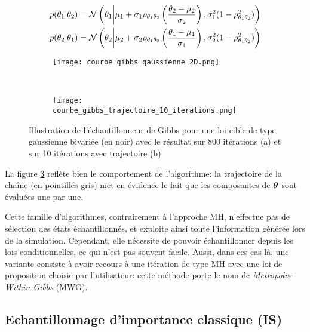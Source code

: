  \begin{equation}
 \label{eq_conditionnelles_gaussienne_bivariee}
 \begin{split}
 p(\theta_1 | \theta_2) &= \mathcal{N}\left(\theta_1 \middle\vert \mu_1 + \sigma_1 {\rho}_{\theta_1\theta_2} \left(\dfrac{\theta_2 - \mu_2}{\sigma_2}\right), \sigma_1^2 (1-{\rho}_{\theta_1\theta_2}^2)\right) \\
 p(\theta_2 | \theta_1) &= \mathcal{N}\left(\theta_2 \middle\vert \mu_2 + \sigma_2 {\rho}_{\theta_1\theta_2} \left(\dfrac{\theta_1 - \mu_1}{\sigma_1}\right), \sigma_2^2 (1-{\rho}_{\theta_1\theta_2}^2)\right)
 \end{split}
 \end{equation}
 
\begin{figure}[h!]
	\centering
	\begin{subfigure}[t]{0.5\textwidth}
		\centering
		\texttt{[image: courbe\_gibbs\_gaussienne\_2D.png]}
		\caption{}
		\label{subfig_gibbs_all}
	\end{subfigure}%
	~ 
	\begin{subfigure}[t]{0.5\textwidth}
		\centering
		\texttt{[image: courbe\_gibbs\_trajectoire\_10\_iterations.png]}
		\caption{}
		\label{subfig_gibbs_10}
	\end{subfigure}
	\caption{Illustration de l'échantillonneur de Gibbs pour une loi cible de type gaussienne bivariée (en noir) avec le résultat sur 800 itérations (a) et sur 10 itérations avec trajectoire (b)}
\end{figure}

La figure \ref{subfig_gibbs_10} reflète bien le comportement de l'algorithme: la trajectoire de la chaîne (en pointillés gris) met en évidence le fait que les composantes de ${\bm{\theta}}$ sont évaluées une par une. 

Cette famille d'algorithmes, contrairement à l'approche MH, n'effectue pas de sélection des états échantillonnés, et exploite ainsi toute l'information générée lors de la simulation. Cependant, elle nécessite de pouvoir échantillonner depuis les lois conditionnelles, ce qui n'est pas souvent facile. Aussi, dans ces cas-là, une variante consiste à avoir recours à une itération de type MH avec une loi de proposition choisie par l'utilisateur: cette méthode porte le nom de \textit{Metropolis-Within-Gibbs} (MWG).\\

 
 \subsection{Echantillonnage d'importance classique (IS)}
 
